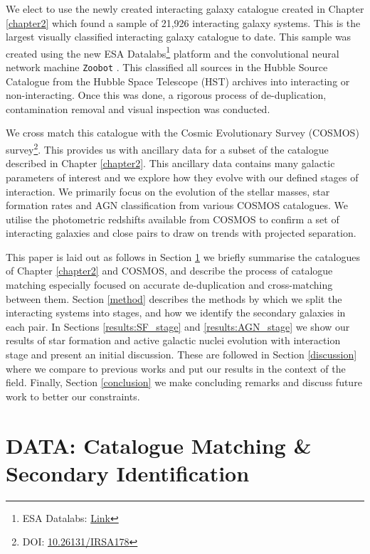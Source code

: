 We elect to use the newly created interacting galaxy catalogue created in Chapter \ref{chapter2} which found a sample of 21,926 interacting galaxy systems. This is the largest visually classified interacting galaxy catalogue to date. This sample was created using the new ESA Datalabs\footnote{ESA Datalabs: \href{https://datalabs.esa.int/}{Link}} platform and the convolutional neural network machine \texttt{Zoobot} \citep{2022MNRAS.509.3966W, 2023JOSS....8.5312W}. This classified all sources in the Hubble Source Catalogue \citep{2016AJ....151..134W} from the Hubble Space Telescope (HST) archives into interacting or non-interacting. Once this was done, a rigorous process of de-duplication, contamination removal and visual inspection was conducted.

We cross match this catalogue with the Cosmic Evolutionary Survey (COSMOS) survey\footnote{DOI: \href{https://www.ipac.caltech.edu/doi/irsa/10.26131/IRSA178}{10.26131/IRSA178}}. This provides us with ancillary data for a subset of the catalogue described in Chapter \ref{chapter2}. This ancillary data contains many galactic parameters of interest and we explore how they evolve with our defined stages of interaction. We primarily focus on the evolution of the stellar masses, star formation rates and AGN classification from various COSMOS catalogues. We utilise the photometric redshifts available from COSMOS to confirm a set of interacting galaxies and close pairs to draw on trends with projected separation.

This paper is laid out as follows in Section \ref{data} we briefly summarise the catalogues of Chapter \ref{chapter2} and COSMOS, and describe the process of catalogue matching especially focused on accurate de-duplication and cross-matching between them.  Section \ref{method} describes the methods by which we split the interacting systems into stages, and how we identify the secondary galaxies in each pair. In Sections \ref{results:SF_stage} and \ref{results:AGN_stage} we show our results of star formation and active galactic nuclei evolution with interaction stage and present an initial discussion. These are followed in Section \ref{discussion} where we compare to previous works and put our results in the context of the field. Finally, Section \ref{conclusion} we make concluding remarks and discuss future work to better our constraints. 

\section{DATA: Catalogue Matching \& Secondary Identification} \label{data}
